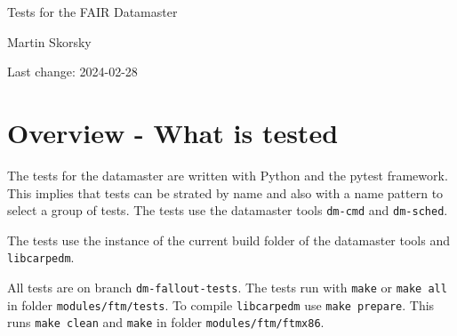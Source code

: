 \documentclass[12pt,a4paper]{report}
\begin{document}
\begin{titlepage}
\vspace{2cm}
\begin{center}
\Huge{Tests for the FAIR Datamaster}

\Large{Martin Skorsky}

\Large{Last change: 2024-02-28}
\end{center}
\vfill
\end{titlepage}

\tableofcontents

\chapter{Overview - What is tested}
The tests for the datamaster are written with Python and the pytest framework. This implies that tests can be strated
by name and also with a name pattern to select a group of tests. The tests use the datamaster tools \texttt{dm-cmd}
and \texttt{dm-sched}.

The tests use the instance of the current build folder of the datamaster tools and \texttt{libcarpedm}.

All tests are on branch \texttt{dm-fallout-tests}. The tests run with \texttt{make} or \texttt{make all} in folder \texttt{modules/ftm/tests}.
To compile \texttt{libcarpedm} use \texttt{make prepare}. This runs \texttt{make clean} and \texttt{make} in folder \texttt{modules/ftm/ftmx86}.
\end{document}
